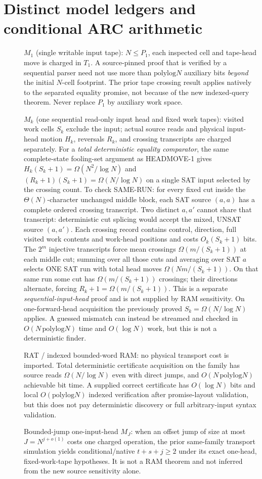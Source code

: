 \documentclass[11pt]{article}
\begin{document}
\section{Distinct model ledgers and conditional ARC arithmetic}
\begin{description}
\item[] $M_1$ (single writable input tape): $N\le P_1$, each inspected cell and tape-head move is charged in $T_1$. A source-pinned proof that is verified by a sequential parser need not use more than $\mathrm{polylog}N$ auxiliary bits \emph{beyond} the initial $N$-cell footprint. The prior tape crossing result applies natively to the separated equality promise, not because of the new indexed-query theorem. Never replace $P_1$ by auxiliary work space.
\item[] $M_k$ (one sequential read-only input head and fixed work tapes): visited work cells $S_k$ exclude the input; actual source reads and physical input-head motion $H_k$, reversals $R_k$, and crossing transcripts are charged separately. For a \emph{total deterministic equality comparator}, the same complete-state fooling-set argument as HEADMOVE-1 gives $H_k(S_k+1)=\Omega(N^2/\log N)$ and $(R_k+1)(S_k+1)=\Omega(N/\log N)$ on a single SAT input selected by the crossing count. To check SAME-RUN: for every fixed cut inside the $\Theta(N)$-character unchanged middle block, each SAT source $(a,a)$ has a complete ordered crossing transcript. Two distinct $a,a\prime$ cannot share that transcript: deterministic cut splicing would accept the mixed, UNSAT source $(a,a\prime)$. Each crossing record contains control, direction, full visited work contents and work-head positions and costs $O_k(S_k+1)$ bits. The $2^m$ injective transcripts force mean crossings $\Omega(m/(S_k+1))$ at each middle cut; summing over all those cuts and averaging over SAT $a$ selects ONE SAT run with total head moves $\Omega(Nm/(S_k+1))$. On that same run some cut has $\Omega(m/(S_k+1))$ crossings; their directions alternate, forcing $R_k+1=\Omega(m/(S_k+1))$. This is a separate \emph{sequential-input-head} proof and is not supplied by RAM sensitivity. On one-forward-head acquisition the previously proved $S_k=\Omega(N/\log N)$ applies. A guessed mismatch can instead be streamed and checked in $O(N\,\mathrm{polylog}N)$ time and $O(\log N)$ work, but this is not a deterministic finder.
\item[] RAT / indexed bounded-word RAM: no physical transport cost is imported. Total deterministic certificate acquisition on the family has source reads $\Omega(N/\log N)$ even with direct jumps, and $O(N\,\mathrm{polylog}N)$ achievable bit time. A supplied correct certificate has $O(\log N)$ bits and local $O(\mathrm{polylog}N)$ indexed verification after promise-layout validation, but this does not pay deterministic discovery or full arbitrary-input syntax validation.
\item[] Bounded-jump one-input-head $M_J$: when an offset jump of size at most $J=N^{j+o(1)}$ costs one charged operation, the prior same-family transport simulation yields conditional/native $t+s+j\ge2$ under its exact one-head, fixed-work-tape hypotheses. It is not a RAM theorem and not inferred from the new source sensitivity alone.
\end{description}
\end{document}
